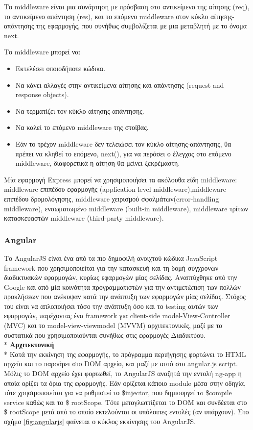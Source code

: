 Το middleware είναι μια συνάρτηση με πρόσβαση στο αντικείμενο της αίτησης (req), το αντικείμενο απάντηση (res), και το επόμενο middleware στον κύκλο αίτησης-απάντησης της εφαρμογής, που συνήθως συμβολίζεται με μια μεταβλητή με το όνομα next.

Το middleware μπορεί να:

\begin{itemize}

\item Εκτελέσει οποιοδήποτε κώδικα.
\item Να κάνει αλλαγές στην αντικείμενα αίτησης και απάντησης (request and response objects).
\item Να τερματίζει τον κύκλο αίτησης-απάντησης.
\item Να καλεί το επόμενο middleware της στοίβας.
\item Εάν το τρέχον middleware δεν τελειώσει τον κύκλο αίτησης-απάντησης, θα πρέπει να κληθεί το επόμενο, next(), για να περάσει ο έλεγχος στο επόμενο middleware, διαφορετικά η αίτηση θα μείνει ξεκρέμαστη.

\end{itemize}


Μία εφαρμογή Express μπορεί να χρησιμοποιήσει τα ακόλουθα είδη middleware: middleware επιπέδου εφαρμογής (application-level middleware),middleware επιπέδου δρομολόγησης, middleware χειρισμού σφαλμάτων(error-handling middleware), ενσωματωμένο middleware (built-in middleware), middleware τρίτων κατασκευαστών middleware (third-party middleware). 


		\subsubsection{Angular}
		Το AngularJS είναι ένα από τα πιο δημοφιλή ανοιχτού κώδικα JavaScript framework που χρησιμοποιείται για την κατασκευή και τη δομή σύγχρονων διαδικτυακών εφαρμογών, κυρίως εφαρμογών μίας σελίδας. Αναπτύχθηκε από την Google και από μία κοινότητα προγραμματιστών για την αντιμετώπιση των πολλών προκλήσεων που ανέκυψαν κατά την ανάπτυξη των εφαρμογών μίας σελίδας.  Στόχος του είναι να απλοποιήσει τόσο την ανάπτυξη όσο και το testing αυτών των εφαρμογών, παρέχοντας ένα framework για client-side model-View-Controller (MVC) και το model-view-viewmodel (MVVM) αρχιτεκτονικές, μαζί με τα συστατικά που χρησιμοποιούνται συνήθως στις εφαρμογές Διαδικτύου.
	   \\*
			    \textbf{Αρχιτεκτονική}
	 \\*
		Κατά την εκκίνηση της εφαρμογής, το πρόγραμμα περιήγησης φορτώνει το HTML αρχείο και το παρσάρει στο DOM αρχείο, και μαζί με αυτό στο angular.js script. Μόλις το DOM αρχείο έχει φορτωθεί, το AngularJS αναζητά την εντολή ng-app η οποία ορίζει τα όρια της εφαρμογής. Εάν ορίζεται κάποιο module μέσα στην οδηγία, τότε χρησιμοποιείται για να ρυθμιστεί το \$injector, που δημιουργεί τo \$compile service καθώς και το \$ rootScope. Τότε μεταγλωττίζεται το DOM και συνδέεται στο \$ rootScope μετά από το οποίο εκτελούνται οι υπόλοιπες εντολές (αν υπάρχουν). Στο σχήμα \ref{fig:angularjs} φαίνεται ο κύκλος εκκίνησης του AngularJS.
		
